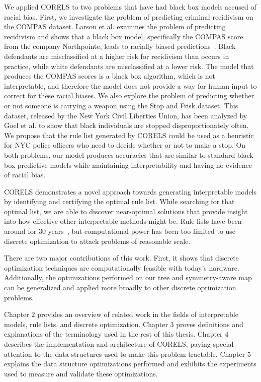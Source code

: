 We applied CORELS to two problems that have had black box models accused of racial bias.
First, we investigate the problem of predicting criminal recidivism on the COMPAS dataset.
Larson et al. examines the problem of predicting recidivism and shows that a black box model, specifically the COMPAS score from the company Northpointe, leads to racially biased predictions~\cite{LarsonMaKiAn16}.
Black defendants are misclassified at a higher risk for recidivism than occurs in practice, while white defendants are misclassified at a lower risk. 
The model that produces the COMPAS scores is a black box algorithm, which is not interpretable, and therefore the model does not provide a way for human input to correct for these racial biases. 
We also explore the problem of predicting whether or not someone is carrying a weapon using the Stop and Frisk dataset.
This dataset, released by the New York Civil Liberties Union, has been analyzed by Goel et al. to show that black individuals are stopped disproportionately often.
We propose that the rule list generated by CORELS could be used as a heuristic for NYC police officers who need to decide whether or not to make a stop.
On both problems, our model produces accuracies that are similar to standard black-box predictive models while maintaining interpretability and having no evidence of racial bias.

CORELS demonstrates a novel approach towards generating interpretable models by identifying and certifying the optimal rule list. 
While searching for that optimal list, we are able to discover near-optimal solutions that provide insight into how effective other interpretable methods might be. 
Rule lists have been around for $30$ years~\cite{Rivest87}, but computational power has been too limited to use discrete optimization to attack problems of reasonable scale.

There are two major contributions of this work.
First, it shows that discrete optimization techniques are computationally feasible with today's hardware.
Additionally, the optimizations performed on our tree and symmetry-aware map can be generalized and applied more broadly to other discrete optimization problems.

Chapter $2$ provides an overview of related work in the fields of interpretable models, rule lists, and discrete optimization. 
Chapter $3$ proves definitions and explanations of the terminology used in the rest of this thesis.
Chapter $4$ describes the implementation and architecture of CORELS, paying special attention to the data structures used to make this problem tractable.
Chapter $5$ explains the data structure optimizations performed and exhibits the experiments used to measure and validate these optimizations.

